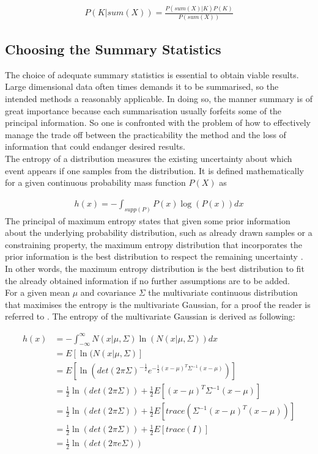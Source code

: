 \documentclass[a4paper, 11pt]{article}
\begin{document}
\begin{align*}
P(K | sum(X)) = \frac{P(sum(X) | K) P(K)}{P(sum(X))}
\end{align*}

\subsection{Choosing the Summary Statistics}

The choice of adequate summary statistics is essential to obtain viable results. Large dimensional data often times demands it to be summarised, so the intended methods a reasonably applicable. In doing so, the manner summary is of great importance because each summarisation usually forfeits some of the principal information. So one is confronted with the problem of how to effectively manage the trade off between the practicability the method and the loss of information that could endanger desired results.\\
The entropy of a distribution measures the existing uncertainty about which event appears if one samples from the distribution. It is defined mathematically for a given continuous probability mass function $P(X)$ as

\begin{align*}
h(x) = - \int_{supp(P)}P(x)\log(P(x))dx
\end{align*}
The principal of maximum entropy states that given some prior information about the underlying probability distribution, such as already drawn samples or a constraining property, the maximum entropy distribution that incorporates the prior information is the best distribution to respect the remaining uncertainty \parencite{jaynes1957information}. In other words, the maximum entropy distribution is the best distribution to fit the already obtained information if no further assumptions are to be added. \\
For a given mean $\mu$ and covariance $\Sigma$ the multivariate continuous distribution that maximises the entropy is the multivariate Gaussian, for a proof the reader is referred to \cite{cover2012elements}.
The entropy of the multivariate Gaussian is derived as following:

\begin{align*}
h(x) & = - \int_{-\infty}^{\infty} N(x|\mu, \Sigma)\ln(N(x|\mu, \Sigma))dx \\
& = E[\ln(N(x|\mu, \Sigma)] \\
& = E[\ln(det(2\pi\Sigma)^{-\frac{1}{2}}e^{-\frac{1}{2}(x-\mu)^T\Sigma^{-1}(x-\mu)})] \\
& = \frac{1}{2}\ln(det(2\pi\Sigma)) + \frac{1}{2} E[(x-\mu)^T \Sigma^{-1}(x-\mu)]\\
& = \frac{1}{2} \ln(det(2\pi\Sigma)) + \frac{1}{2} E[trace(\Sigma^{-1}(x-\mu)^T (x-\mu))]\\
& = \frac{1}{2} \ln(det(2\pi\Sigma)) + \frac{1}{2} E[trace(I)]\\
& = \frac{1}{2} \ln(det(2\pi e \Sigma))
\end{align*}
\end{document}
